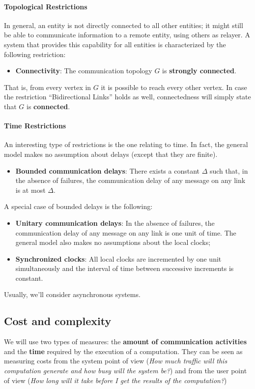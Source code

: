 \paragraph{Topological Restrictions} In general, an entity is not directly connected to all other entities; it might still be able to communicate information to a remote entity, using others as relayer. A system that provides this capability for all entities is characterized by the following restriction:
\begin{itemize}
    \item \textbf{Connectivity}: The communication topology $G$ is \textbf{strongly connected}.
\end{itemize} 

That is, from every vertex in $G$ it is possible to reach every other vertex. In case the restriction “Bidirectional Links” holds as well, connectedness will simply state that $G$ is \textbf{connected}.

\paragraph{Time Restrictions} An interesting type of restrictions is the one relating to time. In fact, the general model makes no assumption about delays (except that they are finite).
\begin{itemize}
    \item \textbf{Bounded communication delays}: There exists a constant $\Delta$ such that, in the absence of failures, the communication delay of any message on any link is at most $\Delta$.
\end{itemize}

A special case of bounded delays is the following:
\begin{itemize}
    \item \textbf{Unitary communication delays}: In the absence of failures, the communication delay of any message on any link is one unit of time. The general model also makes no assumptions about the local clocks;
    \item \textbf{Synchronized clocks}: All local clocks are incremented by one unit simultaneously and the interval of time between successive increments is constant.
\end{itemize}

Usually, we'll consider asynchronous systems.

\subsection{Cost and complexity}
We will use two types of measures: the \textbf{amount of communication activities} and the \textbf{time} required by the execution of a computation. They can be seen as measuring costs from the system point of view (\textit{How much traffic will this computation generate and how busy will the system be?}) and from the user point of view (\textit{How long will it take before I get the results of the computation?})

